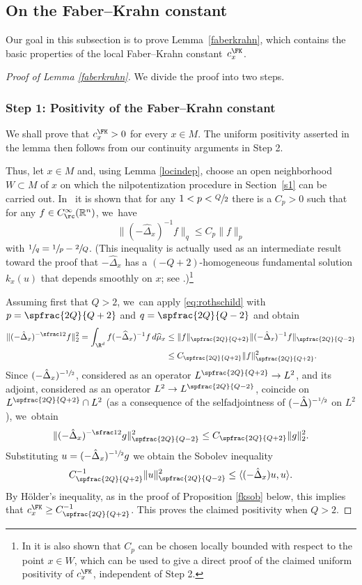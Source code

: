 \subsection{On the Faber--Krahn constant}\label{sec:fk}
Our goal in this subsection is to prove Lem\-ma~\ref{faberkrahn}, which contains the basic properties of the local Faber--Krahn constant~$c^\FK_x$.

\begin{proof}[Proof of Lemma \ref{faberkrahn}]
We divide the proof into two steps.

\subsubsection*{Step 1: Positivity of the Faber--Krahn constant}
We shall prove that $c_x^\FK>0$ for every $x\in M$. The uniform positivity asserted in the lemma then follows from our continuity arguments in Step 2.

Thus, let $x\in M$ and, using Lemma \ref{locindep}, choose an open neighborhood $W\subset M$ of $x$ on which the nilpotentization procedure in Section~\ref{s1} can be carried out. In~\cite[Th.\,4.24]{Rot} it is shown that for any $1<p<\sfrac Q2$ there is a $C_{p} >0$ such that for any $f \in C_\rc^\infty (\mathbb R^n)$, we~have
\begin{equation}
\label{eq:rothschild}
\| (-\widehat \Delta_x)^{-1} f \|_q \leq C_{p} \| f \|_p
\end{equation}
with $\sfrac 1q=\sfrac 1p -\sfrac 2 Q$.
(This inequality is actually used as an intermediate result toward the proof that $-\widehat \Delta_x$ has a $(-Q+2)$-homogeneous fundamental solution $k_x(u)$ that depends smoothly on $x$; see \cite[Th.\,3.6]{Rot}.)\footnote{In \cite{Rot} it is also shown that $C_p$ can be chosen locally bounded with respect to the point $x\in W$, which can be used to give a direct proof of the claimed uniform positivity of $c^\FK_x$, independent of Step 2.}

Assuming first that $Q>2$, we~can apply \eqref{eq:rothschild} with $p=\spfrac{2Q}{Q+2}$ and $q=\spfrac{2Q}{Q-2}$ and obtain
\begin{align*}
\| (-\hat\Delta_x)^{-\sfrac12} f\|_2^2 =
\int_{\R^d} f (-\widehat \Delta_x)^{-1} f \,d\widehat\mu_x &\leq \| f\|_{\spfrac{2Q}{Q+2}} \|(-\hat\Delta_x)^{-1} f\|_{\spfrac{2Q}{Q-2}}\\
&\leq C_{\spfrac{2Q}{Q+2}} \| f \|_{\spfrac{2Q}{Q+2}}^2.
\end{align*}
Since $(-\hat\Delta_x)^{-\sfrac12}$, considered as an operator $L^{\spfrac{2Q}{Q+2}}\to L^2$, and its adjoint, considered as an operator $L^2\to L^{\spfrac{2Q}{Q-2}}$, coincide on $L^{\spfrac{2Q}{Q+2}}\cap L^2$ (as a consequence of the selfadjointness of $(-\hat\Delta)^{-\sfrac12}$ on $L^2$), we~obtain
\[
\| (-\hat\Delta_x)^{-\sfrac12} g\|_{\spfrac{2Q}{Q-2}}^2 \leq C_{\spfrac{2Q}{Q+2}} \| g \|_{2}^2.
\]
Substituting $u=(-\hat\Delta_x)^{-\sfrac12} g$ we obtain the Sobolev inequality
\[
C_{\spfrac{2Q}{Q+2}}^{-1} \| u \|_{\spfrac{2Q}{Q-2}}^2 \leq \langle (-\hat\Delta_x) u,u \rangle.
\]
By Hölder's inequality, as in the proof of Proposition \ref{fksob} below, this implies that $c_x^\FK\geq C_{\spfrac{2Q}{Q+2}}^{-1}$. This proves the claimed positivity when $Q>2$.


\end{proof}
